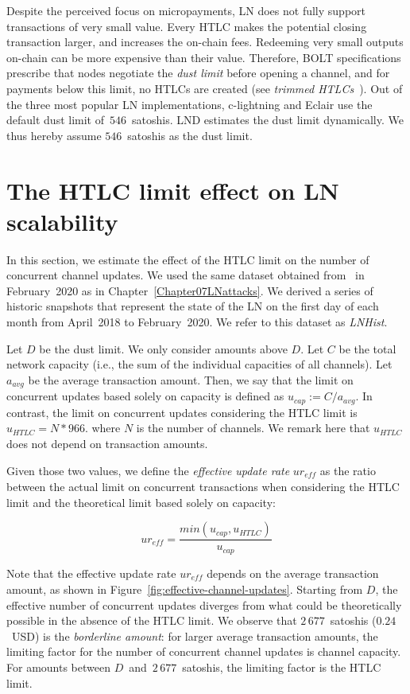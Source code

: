 Despite the perceived focus on micropayments, LN does not fully support transactions of very small value.
Every HTLC makes the potential closing transaction larger, and increases the on-chain fees.
Redeeming very small outputs on-chain can be more expensive than their value.
Therefore, BOLT specifications prescribe that nodes negotiate the \textit{dust limit} before opening a channel, and for payments below this limit, no HTLCs are created (see \textit{trimmed HTLCs}~\cite{BOLT3Trimmed}).
Out of the three most popular LN implementations, c-lightning and Eclair use the default dust limit of~$546$~satoshis.
LND estimates the dust limit dynamically.
We thus hereby assume $546$~satoshis as the dust limit.


\section{The HTLC limit effect on LN scalability}

In this section, we estimate the effect of the HTLC limit on the number of concurrent channel updates.
We used the same dataset obtained from~\cite{fiatjaf2020} in February~2020 as in Chapter~\ref{Chapter07LNattacks}.
We derived a series of historic snapshots that represent the state of the LN on the first day of each month from April~2018 to February~2020.
We refer to this dataset as \textit{LNHist}.

Let $D$ be the dust limit.
We only consider amounts above $D$.
Let $C$ be the total network capacity (i.e., the sum of the individual capacities of all channels).
Let $a_\textit{avg}$ be the average transaction amount.
Then, we say that the limit on concurrent updates based solely on capacity is defined as $u_\textit{cap} := C / a_\textit{avg}$.
In contrast, the limit on concurrent updates considering the HTLC limit is $u_\textit{HTLC} = N * 966$.
where $N$ is the number of channels. We remark here that $u_\textit{HTLC}$ does not depend on transaction amounts.

Given those two values, we define the \textit{effective update rate} $ur_\textit{eff}$ as the ratio between the actual limit on concurrent transactions when considering the HTLC limit and the theoretical limit based solely on capacity:

\[ur_\textit{eff} = \frac{min(u_\textit{cap}, u_\textit{HTLC})}{u_\textit{cap}}\]

Note that the effective update rate $ur_\textit{eff}$ depends on the average transaction amount, as shown in Figure~\ref{fig:effective-channel-updates}.
Starting from $D$, the effective number of concurrent updates diverges from what could be theoretically possible in the absence of the HTLC limit.
We observe that $2\,677$~satoshis ($0.24$~USD) is the \textit{borderline amount}: for larger average transaction amounts, the limiting factor for the number of concurrent channel updates is channel capacity.
For amounts between $D$~and~$2\,677$~satoshis, the limiting factor is the HTLC limit.

